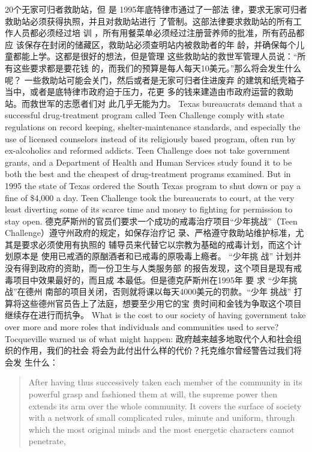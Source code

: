 \begin{paracol}{2}
20个无家可归者救助站，但 是 1995年底特律市通过了一部法
律，要求无家可归者救助站必须获得执照，并且对救助站进行
了管制。这部法律要求救助站的所有工作人员都必须经过培
训 ，所有用餐菜单必须经过注册营养师的批准，所有药品都应
该保存在封闭的储藏区，救助站必须查明站内被救助者的年
龄，并确保每个儿童都能上学。这都是很好的想法，但是管理
这些救助站的救世军管理人员说：“所有这些要求都是要花钱
的，而我们的预算是每人每天10美元。”那么将会发生什么
呢？ 一些救助站可能会关门，然后或者是无家可归者住进废弃
的建筑和纸壳箱子当中，或者是底特律市政府迫于压力，花更
多的钱来建造由市政府运营的救助站。而救世军的志愿者们对
此几乎无能为力。
\switchcolumn*
Texas bureaucrats demand that a successful drug-treatment
program called Teen Challenge comply with state regulations
on record keeping, shelter-maintenance standards, and especially the use of licensed counselors instead of its religiously
based program, often run by ex-alcoholics and reformed addicts. Teen Challenge does not take government grants, and a
Department of Health and Human Services study found it to
be both the best and the cheapest of drug-treatment programs
examined. But in 1995 the state of Texas ordered the South
Texas program to shut down or pay a fine of \$4,000 a day. Teen
Challenge took the bureaucrats to court, at the very least diverting some of its scarce time and money to fighting for permission to stay open.
\switchcolumn
德克萨斯州的官员们要求一个成功的戒毒治疗项目“少年挑战”（Teen  Challenge）遵守州政府的规定，如保存治疗记
录、严格遵守救助站维护标准，尤其是要求必须使用有执照的
辅导员来代替它以宗教为基础的戒毒计划，而这个计划原本是
使用已戒酒的原酗酒者和已戒毒的原吸毒上瘾者。 “少年挑
战” 计划并没有得到政府的资助，而一份卫生与人类服务部
的报告发现，这个项目是现有戒毒项目中效果最好的，而且成
本最低。但是德克萨斯州在1995年 要 求 “少年挑战”在德州
南部的项目关闭，否则就将课以每天4000美元的罚款。“少年
挑战” 打算将这些德州官员告上了法庭，想要至少用它的宝
贵时间和金钱为争取这个项目继续存在进行而抗争。
\switchcolumn*
What is the cost to our society of having government take
over more and more roles that individuals and communities
used to serve? Tocqueville warned us of what might happen:
\switchcolumn
政府越来越多地取代个人和社会组织的作用，我们的社会
将会为此付出什么样的代价？托克维尔曾经警告过我们将会发
生什么：
\switchcolumn*
\begin{quote}
After having thus successively taken each member of the community in its powerful grasp and fashioned them at will, the
supreme power then extends its arm over the whole community.
It covers the surface of society with a network of small complicated rules, minute and uniform, through which the most original minds and the most energetic characters cannot penetrate,

\end{quote}
\end{paracol}
